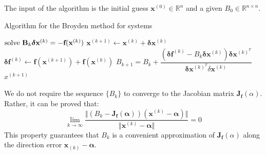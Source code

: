 \documentclass[12pt, a4paper]{report}
\newtheorem[style=M,bodystyle=\normalfont]{theorem}{Theorem}
\newtheorem[style=M,bodystyle=\normalfont]{proposition}{Proposition}
\newtheorem[style=M,bodystyle=\normalfont]{corollary}{Corollary}
\newtheorem[style=M,bodystyle=\normalfont]{lemma}{Lemma}
\newtheorem[style=M,bodystyle=\normalfont]{definition}{Definition}
\begin{document}
    The input of the algorithm is the initial guess $\textbf{x}^{(0)} \in \mathbb{R}^n$ and a given $B_0 \in \mathbb{R}^{n \times n}$. 
    \begin{algorithm}[H]
        \caption{Algorithm for the Broyden method for systems}
            \begin{algorithmic}[1]
                    \State $\textnormal{solve  } \textbf{B}_k\boldsymbol{\delta}\textbf{x}^{(k)}=-\textbf{f}(\textbf{x}^{(k)})$
                    \State $\textbf{x}^{(k+1)} \leftarrow \textbf{x}^{(k)}+\boldsymbol{\delta}\textbf{x}^{(k)}$
                    \State $\boldsymbol{\delta}\textbf{f}^{(k)} \leftarrow \textbf{f}(\textbf{x}^{(k+1)})+\textbf{f}(\textbf{x}^{(k)})$
                    \State $B_{k+1}=B_k+\dfrac{\left(\boldsymbol{\delta}\textbf{f}^{(k)}-B_k\boldsymbol{\delta}\textbf{x}^{(k)}\right)\boldsymbol{\delta}\textbf{x}^{(k)^T}}
                    {\boldsymbol{\delta}\textbf{x}^{(k)^T}\delta\textbf{x}^{(k)}}$
                        \State \Return $x^{(k+1)}$
                    \EndIf
                \EndFor
            \end{algorithmic}
    \end{algorithm}
    We do not require the sequence $\{B_k\}$ to converge to the Jacobian matrix $\textbf{J}_{\textbf{f}}(\alpha)$. Rather, it can be proved that:
    \[\lim_{k \rightarrow \infty}\dfrac{\Vert \left( B_k-\textbf{J}_{\textbf{f}}(\boldsymbol{\alpha}) \right) \left( \textbf{x}^{(k)}-\boldsymbol{\alpha} \right) \Vert}{\Vert 
    \textbf{x}^{(k)}-\boldsymbol{\alpha} \Vert}=0\]
    This property guarantees that $B_k$ is a convenient approximation of $\textbf{J}_{\textbf{f}}(\alpha)$ along the direction error $\textbf{x}_{(k)}-\boldsymbol{\alpha}$. 
\end{document}

